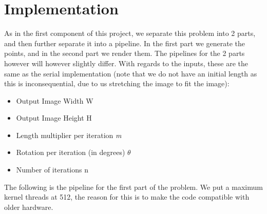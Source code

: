 \section{Implementation}
As in the first component of this project, we separate this problem into 2 parts, and then further separate it into a pipeline. In the first part we generate the points, and in the second part we render them. The pipelines for the 2 parts however will however slightly differ. With regards to the inputs, these are the same as the serial implementation (note that we do not have an initial length as this is inconsequential, due to us stretching the image to fit the image):

\begin{itemize}
	\item Output Image Width W
	\item Output Image Height H
	\item Length multiplier per iteration \textit{m}
	\item Rotation per iteration (in degrees) $\theta$
	\item Number of iterations n
\end{itemize}

The following is the pipeline for the first part of the problem. We put a maximum kernel threads at 512, the reason for this is to make the code compatible with older hardware.

